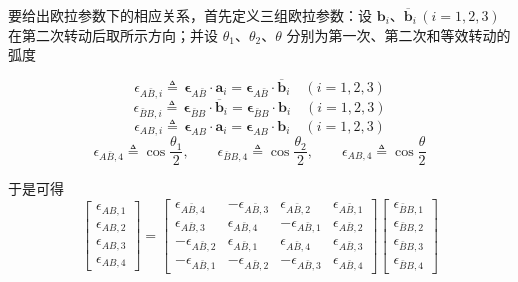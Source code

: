 要给出欧拉参数下的相应关系，首先定义三组欧拉参数：设 $\mathbf{b}_i$、$\overline{\mathbf{b}}_i\,(i=1,2,3)$ 在第二次转动后取所示方向；并设 $\theta_1$、$\theta_2$、$\theta$ 分别为第一次、第二次和等效转动的弧度

\begin{equation}\label{eq:连续转动:epsilon_Abar_B_i}
\epsilon_{A\bar B,i}\triangleq\,\boldsymbol{\epsilon}_{A\bar B}\cdot\mathbf{a}_i=\boldsymbol{\epsilon}_{A\bar B}\cdot\overline{\mathbf{b}}_i\quad(i=1,2,3)
\end{equation}
\begin{equation}\label{eq:连续转动:epsilon_Bar_B_B_i}
\epsilon_{\bar B B,i}\triangleq\,\boldsymbol{\epsilon}_{\bar B B}\cdot\overline{\mathbf{b}}_i=\boldsymbol{\epsilon}_{\bar B B}\cdot\mathbf{b}_i\quad(i=1,2,3)
\end{equation}
\begin{equation}\label{eq:连续转动:epsilon_AB_i}
\epsilon_{AB,i}\triangleq\,\boldsymbol{\epsilon}_{AB}\cdot\mathbf{a}_i=\boldsymbol{\epsilon}_{AB}\cdot\mathbf{b}_i\quad(i=1,2,3)
\end{equation}
$$
\epsilon_{A\bar B,4}\triangleq\cos\frac{\theta_1}{2},\qquad
\epsilon_{\bar B B,4}\triangleq\cos\frac{\theta_2}{2},\qquad
\epsilon_{AB,4}\triangleq\cos\frac{\theta}{2}
$$

于是可得
\begin{equation}\label{eq:连续转动:欧拉参数关系}
\begin{bmatrix}
\epsilon_{AB,1}\\[2pt] \epsilon_{AB,2}\\[2pt] \epsilon_{AB,3}\\[2pt] \epsilon_{AB,4}
\end{bmatrix}
=
\begin{bmatrix}
\epsilon_{A\bar B,4} & -\epsilon_{A\bar B,3} & \epsilon_{A\bar B,2} & \epsilon_{A\bar B,1}\\
\epsilon_{A\bar B,3} & \epsilon_{A\bar B,4} & -\epsilon_{A\bar B,1} & \epsilon_{A\bar B,2}\\
-\epsilon_{A\bar B,2} & \epsilon_{A\bar B,1} & \epsilon_{A\bar B,4} & \epsilon_{A\bar B,3}\\
-\epsilon_{A\bar B,1} & -\epsilon_{A\bar B,2} & -\epsilon_{A\bar B,3} & \epsilon_{A\bar B,4}
\end{bmatrix}
\begin{bmatrix}
\epsilon_{\bar B B,1}\\[2pt] \epsilon_{\bar B B,2}\\[2pt] \epsilon_{\bar B B,3}\\[2pt] \epsilon_{\bar B B,4}
\end{bmatrix}
\end{equation}

